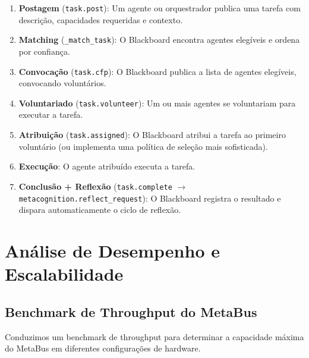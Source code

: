 \begin{enumerate}
    \item \textbf{Postagem} (\texttt{task.post}): Um agente ou orquestrador publica uma tarefa com descrição, capacidades requeridas e contexto.
    
    \item \textbf{Matching} (\texttt{\_match\_task}): O Blackboard encontra agentes elegíveis e ordena por confiança.
    
    \item \textbf{Convocação} (\texttt{task.cfp}): O Blackboard publica a lista de agentes elegíveis, convocando voluntários.
    
    \item \textbf{Voluntariado} (\texttt{task.volunteer}): Um ou mais agentes se voluntariam para executar a tarefa.
    
    \item \textbf{Atribuição} (\texttt{task.assigned}): O Blackboard atribui a tarefa ao primeiro voluntário (ou implementa uma política de seleção mais sofisticada).
    
    \item \textbf{Execução}: O agente atribuído executa a tarefa.
    
    \item \textbf{Conclusão + Reflexão} (\texttt{task.complete} $\rightarrow$ \texttt{metacognition.reflect\_request}): O Blackboard registra o resultado e dispara automaticamente o ciclo de reflexão.
\end{enumerate}

\section{Análise de Desempenho e Escalabilidade}
\label{sec:performance}

\subsection{Benchmark de Throughput do MetaBus}

Conduzimos um benchmark de throughput para determinar a capacidade máxima do MetaBus em diferentes configurações de hardware.

